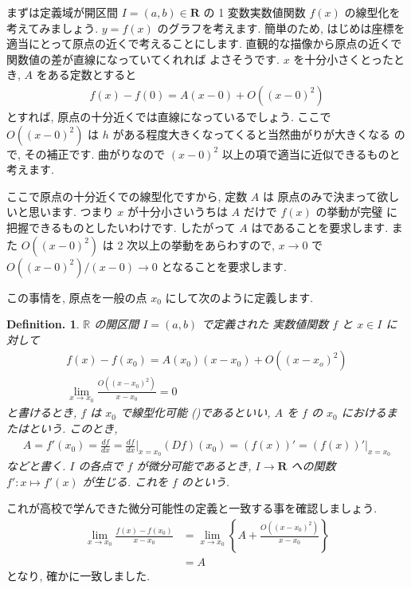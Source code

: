 \documentclass[openany, a4paper, oneside]{book}
\theoremstyle{break}
\theoremstyle{breakdefn}
\newtheorem{defn}[thm]{Definition.}
\newcommand{\bbR}{\mathbb{R}}
\begin{document}
まずは定義域が開区間 $I =(a,b) \in \bm{R}$ の 1 変数実数値関数
 $f (x)$ の線型化を考えてみましょう.
 $y=f (x)$ のグラフを考えます.
簡単のため, はじめは座標を適当にとって原点の近くで考えることにします.
直観的な描像から原点の近くで関数値の差が直線になっていてくれれば
よさそうです.  $x$ を十分小さくとったとき,  $A$ をある定数とすると
    \begin{align}
        f (x) - f (0) = A (x-0) + O\left ( (x-0)^2 \right)
    \end{align}
とすれば, 原点の十分近くでは直線になっているでしょう.
ここで $O\left ( (x-0)^2 \right)$ は $h$ がある程度大きくなってくると当然曲がりが大きくなる
ので, その補正です. 曲がりなので $(x-0)^2$ 以上の項で適当に近似できるものと考えます.

ここで原点の十分近くでの線型化ですから, 定数 $A$ は
原点のみで決まって欲しいと思います.
つまり $x$ が十分小さいうちは $A$ だけで $f (x)$ の挙動が完璧
に把握できるものとしたいわけです.
したがって $A$ はであることを要求します.
また $O\left ( (x-0)^2 \right)$ は 2 次以上の挙動をあらわすので,  $x \rightarrow 0$ で
 $O\left ( (x-0)^2 \right) / (x-0) \rightarrow 0$ となることを要求します.

この事情を, 原点を一般の点 $x_0$ にして次のように定義します.
    \begin{defn} $\bbR$ の開区間 $I=(a,b)$ で定義された
実数値関数 $f$ と $x \in I$ に対して
    \begin{gather}
        f (x) - f (x_0) = A (x_0) (x-x_0) + O\left ( (x-x_o)^2 \right) \\
        \lim_{x \to x_0}\frac{O\left ( (x-x_0)^2 \right) }{x-x_0}=0
    \end{gather}
と書けるとき,  $f$ は $x_0$ で線型化可能 ()であるといい,
 $A$ を $f$ の $x_0$ におけるまたはという.
このとき,
    \begin{align}       A=f'(x_0)=\frac{df}{dx}=\frac{df}{dx} \Big|_{x=x_0}
        (Df) (x_0)=\left ( f (x) \right) ' =
        \left ( f (x) \right) ' \big|_{x=x_0}
    \end{align}
などと書く.  $I$ の各点で $f$ が微分可能であるとき,  $I \to \bm{R}$ への関数
 $f':x \mapsto f'(x)$ が生じる. これを $f$ のという.
\end{defn}

これが高校で学んできた微分可能性の定義と一致する事を確認しましょう.
    \begin{align}
        \lim_{x \to x_0}\frac{ f (x) - f (x_0) }{x-x_0} &=\lim_{x \to x_0}
        \left \{ A + \frac{O\left ( (x-x_0)^2 \right) }{x-x_0} \right \}\\
            &=A
    \end{align}
となり, 確かに一致しました.
\end{document}
